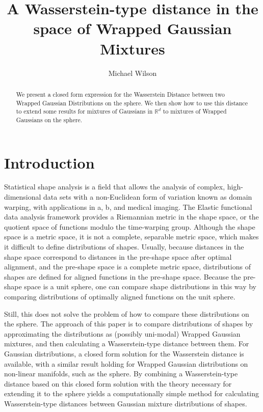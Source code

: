 \documentclass[]{article}
\title{A Wasserstein-type distance in the space of Wrapped Gaussian Mixtures}
\author{Michael Wilson}
\date{}
\begin{document}
	
	\maketitle
	
	\begin{abstract}
	We present a closed form expression for the Wasserstein Distance between two Wrapped Gaussian Distributions on the sphere. We then show how to use this distance to extend some results for mixtures of Gaussians in $\mathbb{R}^d$ to mixtures of Wrapped Gaussians on the sphere.  
	\end{abstract}

\section{Introduction}

Statistical shape analysis is a field that allows the analysis of complex, high-dimensional data sets with a non-Euclidean form of variation known as domain warping, with applications in a, b, and medical imaging. The Elastic functional data analysis framework provides a Riemannian metric in the shape space, or the quotient space of functions modulo the time-warping group. Although the shape space is a metric space, it is not a complete, separable metric space, which makes it difficult to define distributions of shapes. Usually, because distances in the shape space correspond to distances in the pre-shape space after optimal alignment, and the pre-shape space is a complete metric space, distributions of shapes are defined for aligned functions in the pre-shape space. Because the pre-shape space is a unit sphere, one can compare shape distributions in this way by comparing distributions of optimally aligned functions on the unit sphere. 

Still, this does not solve the problem of how to compare these distributions on the sphere. The approach of this paper is to compare distributions of shapes by approximating the distributions as (possibly uni-modal) Wrapped Gaussian mixtures, and then calculating a Wasserstein-type distance between them. For Gaussian distributions, a closed form solution for the Wasserstein distance is available, with a similar result holding for Wrapped Gaussian distributions on non-linear manifolds, such as the sphere. By combining a Wasserstein-type distance based on this closed form solution with the theory necessary for extending it to the sphere yields a computationally simple method for calculating Wasserstein-type distances between Gaussian mixture distributions of shapes.    
\end{document}
